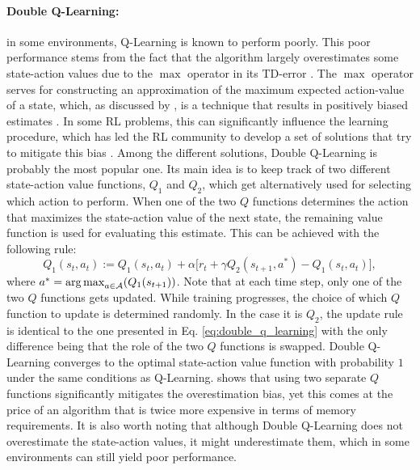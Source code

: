 \paragraph{Double Q-Learning:} in some environments, Q-Learning is known to perform poorly. This poor performance stems from the fact that the algorithm largely overestimates some state-action values due to the $\max$ operator in its TD-error \cite{thrun1993issues}. The $\max$ operator serves for constructing an approximation of the maximum expected action-value of a state, which, as discussed by \citet{hasselt2010double}, is a technique that results in positively biased estimates \cite{van2004rational,smith2006optimizer}. In some RL problems, this can significantly influence the learning procedure, which has led the RL community to develop a set of solutions that try to mitigate this bias \cite{lee2013bias,lee2019bias,zhu2020self,pentaliotis2021variation}. Among the different solutions, Double Q-Learning \cite{hasselt2010double} is probably the most popular one. Its main idea is to keep track of two different state-action value functions, $Q_1$ and $Q_2$, which get alternatively used for selecting which action to perform. When one of the two $Q$ functions determines the action that maximizes the state-action value of the next state, the remaining value function is used for evaluating this estimate. This can be achieved with the following rule:
\begin{equation}
	Q_1(s_t,a_t):=Q_1(s_t,a_t) + \alpha\big[r_t + \gamma Q_2(s_{t+1},a^{*}) - Q_1(s_t, a_t) \big],
\label{eq:double_q_learning}
\end{equation}
where $a^{*}=\operatorname*{arg\,max}_{a\in \mathcal{A}}(Q_1(s_{t+1}))$. Note that at each time step, only one of the two $Q$ functions gets updated. While training progresses, the choice of which $Q$ function to update is determined randomly. In the case it is $Q_2$, the update rule is identical to the one presented in Eq. \ref{eq:double_q_learning} with the only difference being that the role of the two $Q$ functions is swapped. Double Q-Learning converges to the optimal state-action value function with probability $1$ under the same conditions as Q-Learning. \citet{hasselt2010double} shows that using two separate $Q$ functions significantly mitigates the overestimation bias, yet this comes at the price of an algorithm that is twice more expensive in terms of memory requirements. It is also worth noting that although Double Q-Learning does not overestimate the state-action values, it might underestimate them, which in some environments can still yield poor performance.


